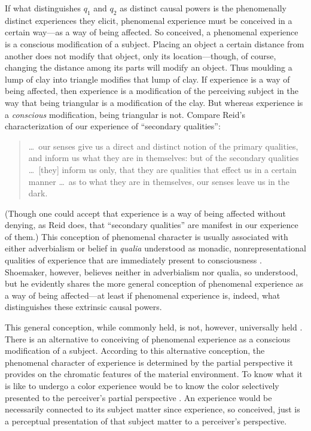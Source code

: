 \documentclass[12pt]{article}
\begin{document}
If what distinguishes $q_1$ and $q_2$ as distinct causal powers is the phenomenally distinct experiences they elicit, phenomenal experience must be conceived in a certain way---as a way of being affected. So conceived, a phenomenal experience is a conscious modification of a subject. Placing an object a certain distance from another does not modify that object, only its location---though, of course, changing the distance among its parts will modify an object. Thus moulding a lump of clay into triangle modifies that lump of clay. If experience is a way of being affected, then experience is a modification of the perceiving subject in the way that being triangular is a modification of the clay. But whereas experience is a \emph{conscious} modification, being triangular is not. Compare Reid's characterization of our experience of ``secondary qualities'': 
\begin{quote}
    \ldots\ our senses give us a direct and distinct notion of the primary qualities, and inform us what they are in themselves: but of the secondary qualities \ldots\ [they] inform us only, that they are qualities that effect us in a certain manner \ldots\ as to what they are in themselves, our senses leave us in the dark. \citep[II, 17]{Reid:1969lr}
\end{quote}
(Though one could accept that experience is a way of being affected without denying, as Reid does, that ``secondary qualities'' are manifest in our experience of them.) This conception of phenomenal character is usually associated with either adverbialism \citep[see][]{Ducasse:1942oq,Jackson:1977fk} or belief in \emph{qualia} understood as monadic, nonrepresentational qualities of experience that are immediately present to consciousness \citep[see][]{Block:1996qf,Jackson:1982my}. Shoemaker, however, believes neither in adverbialism nor qualia, so understood, but he evidently shares the more general conception of phenomenal experience as a way of being affected---at least if phenomenal experience is, indeed, what distinguishes these extrinsic causal powers.

This general conception, while commonly held, is not, however, universally held \cite[for criticism see][]{Kalderon:2006fk,Martin:1998nx}. There is an alternative to conceiving of phenomenal experience as a conscious modification of a subject. According to this alternative conception, the phenomenal character of experience is determined by the partial perspective it provides on the chromatic features of the material environment. To know what it is like to undergo a color experience would be to know the color selectively presented to the perceiver's partial perspective \citep[see][166, 172, 173--4]{Nagel:1979fk}. An experience would be necessarily connected to its subject matter since experience, so conceived, just is a perceptual presentation of that subject matter to a perceiver's perspective. 
\end{document}
